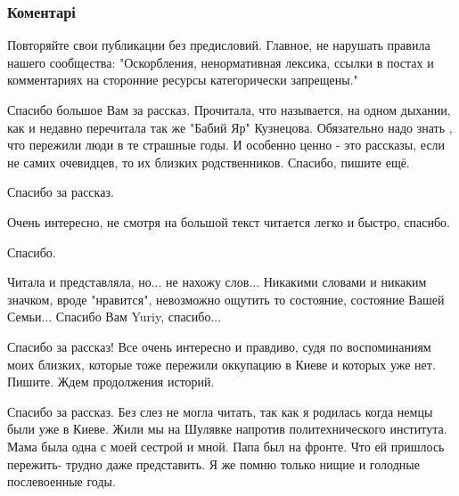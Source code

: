  
 
 
 
 
\subsubsection{Коментарі}

\begin{itemize} %

Повторяйте свои публикации без предисловий. Главное, не нарушать правила нашего
сообщества: "Оскорбления, ненормативная лексика, ссылки в постах и комментариях
на сторонние ресурсы категорически запрещены."


Спасибо большое Вам за рассказ. Прочитала, что называется, на одном дыхании,
как и недавно перечитала так же "Бабий Яр" Кузнецова. Обязательно надо знать ,
что пережили люди в те страшные годы. И особенно ценно - это рассказы, если не
самих очевидцев, то их близких родственников. Спасибо, пишите ещё.

Спасибо за рассказ.

Очень интересно, не смотря на большой текст читается легко и быстро, спасибо.

Спасибо.


Читала и представляла, но... не нахожу слов... Никакими словами и никаким
значком, вроде "нравится", невозможно ощутить то состояние, состояние Вашей
Семьи... Спасибо Вам Yuriy, спасибо...


Спасибо за рассказ! Все очень интересно и правдиво, судя по воспоминаниям моих
близких, которые тоже пережили оккупацию в Киеве и которых уже нет. Пишите.
Ждем продолжения историй.


Спасибо за рассказ. Без слез не могла читать, так как я родилась когда немцы
были уже в Киеве. Жили мы на Шулявке напротив политехнического института. Мама
была одна с моей сестрой и мной. Папа был на фронте. Что ей пришлось пережить-
трудно даже представить. Я же помню только нищие и голодные послевоенные годы.



\end{itemize}
